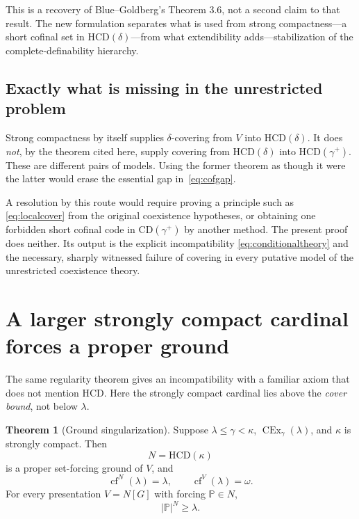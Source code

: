 \documentclass[11pt,letterpaper]{article}
\theoremstyle{definition}
\newtheorem{theorem}[definition]{Theorem}
\newcommand{\CEx}{\operatorname{CEx}}
\newcommand{\cf}{\operatorname{cf}}
\newcommand{\CD}{\mathrm{CD}}
\newcommand{\HCD}{\mathrm{HCD}}
\begin{document}
This is a recovery of Blue--Goldberg's Theorem 3.6, not a second claim to that
result. \cite{cover} The new formulation separates what is used from strong
compactness---a short cofinal set in $\HCD(\delta)$---from what extendibility
adds---stabilization of the complete-definability hierarchy.

\subsection{Exactly what is missing in the unrestricted problem}

Strong compactness by itself supplies $\delta$-covering from $V$ into
$\HCD(\delta)$. It does \emph{not}, by the theorem cited here, supply covering
from $\HCD(\delta)$ into $\HCD(\gamma^+)$. These are different pairs of models.
Using the former theorem as though it were the latter would erase the essential
gap in~\eqref{eq:cofgap}.

A resolution by this route would require proving a principle such as
\eqref{eq:localcover} from the original coexistence hypotheses, or obtaining
one forbidden short cofinal code in $\CD(\gamma^+)$ by another method.
The present proof does neither. Its output is the explicit incompatibility
\eqref{eq:conditionaltheory} and the necessary, sharply witnessed failure of
covering in every putative model of the unrestricted coexistence theory.

\section{A larger strongly compact cardinal forces a proper ground}
\label{sec:ground}

The same regularity theorem gives an incompatibility with a familiar axiom
that does not mention HCD. Here the strongly compact cardinal lies above the
\emph{cover bound}, not below $\lambda$.

\begin{theorem}[Ground singularization]\label{thm:ground}
Suppose $\lambda\leq\gamma<\kappa$, $\CEx_\gamma(\lambda)$, and
$\kappa$ is strongly compact. Then
\[
 N=\HCD(\kappa)
\]
is a proper set-forcing ground of $V$, and
\begin{equation}\label{eq:groundcof}
 \cf^N(\lambda)=\lambda,\qquad \cf^V(\lambda)=\omega.
\end{equation}
For every presentation $V=N[G]$ with forcing $\mathbb P\in N$,
\begin{equation}\label{eq:forcinglower}
 |\mathbb P|^N\geq\lambda.
\end{equation}
\end{theorem}
\end{document}
